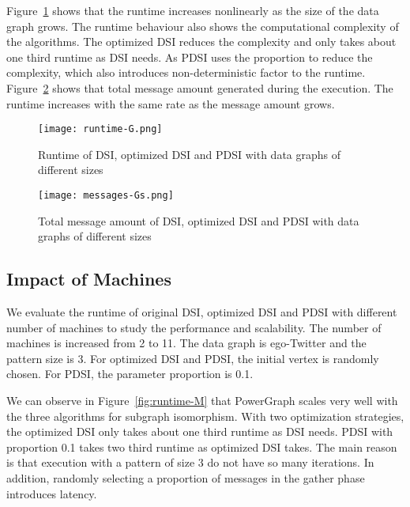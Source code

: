 Figure~\ref{fig:runtime-G} shows that the runtime increases nonlinearly as the size of the data graph grows. The runtime behaviour also shows the computational complexity of the algorithms. The optimized DSI reduces the complexity and only takes about one third runtime as DSI needs. As PDSI uses the proportion to reduce the complexity, which also introduces non-deterministic factor to the runtime. Figure~\ref{fig:messages-G} shows that total message amount generated during the execution. The runtime increases with the same rate as the message amount grows.

\begin{figure}[H]
  \begin{center}
    \texttt{[image: runtime-G.png]}
    \caption{Runtime of DSI, optimized DSI and PDSI with data graphs of different sizes}
    \label{fig:runtime-G}
  \end{center}
\end{figure}

\begin{figure}[H]
  \begin{center}
    \texttt{[image: messages-Gs.png]}
    \caption{Total message amount of DSI, optimized DSI and PDSI with data graphs of different sizes}
    \label{fig:messages-G}
  \end{center}
\end{figure}

\subsection{Impact of Machines}

We evaluate the runtime of original DSI, optimized DSI and PDSI with different number of machines to study the performance and scalability. The number of machines is increased from 2 to 11. The data graph is ego-Twitter and the pattern size is 3. For optimized DSI and PDSI, the initial vertex is randomly chosen. For PDSI, the parameter proportion is 0.1.

We can observe in Figure~\ref{fig:runtime-M} that PowerGraph scales very well with the three algorithms for subgraph isomorphism. With two optimization strategies, the optimized DSI only takes about one third runtime as DSI needs. PDSI with proportion 0.1 takes two third runtime as optimized DSI takes. The main reason is that execution with a pattern of size 3 do not have so many iterations. In addition, randomly selecting a proportion of messages in the gather phase introduces latency.

